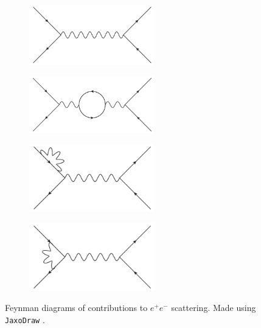 \documentclass[twoside,english]{uiofysmaster}
\begin{document}
\begin{figure}[htbp]
	\centering
	\begin{subfigure}[b]{0.45\textwidth}
		\centering
		\includegraphics[width=0.6\textwidth]{figures/susyintro/epscattering.pdf}
		\caption{ }
		\label{fig:feynmandiagram_a}
	\end{subfigure}
	\begin{subfigure}[b]{0.45\textwidth}
		\centering
		\includegraphics[width=0.6\textwidth]{figures/susyintro/epscattering_fermionloop.pdf}
		\caption{ }
		\label{fig:feynmandiagram_b}
	\end{subfigure}

	\begin{subfigure}[b]{0.45\textwidth}
		\centering
		\includegraphics[width=0.6\textwidth]{figures/susyintro/epscattering_fermioncorr.pdf}
		\caption{ }
		\label{fig:feynmandiagram_c}
	\end{subfigure}
	\begin{subfigure}[b]{0.45\textwidth}
		\centering
		\includegraphics[width=0.6\textwidth]{figures/susyintro/epscattering_vertexcorr.pdf}
		\caption{ }
		\label{fig:feynmandiagram_d}
	\end{subfigure}
	\caption{Feynman diagrams of contributions to $e^+ e^-$ scattering. Made using {\tt JaxoDraw} \cite{Binosi:2003yf}.}
	\label{fig:feynmandiagram}
\end{figure}
\end{document}
